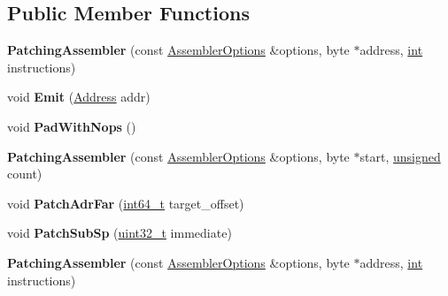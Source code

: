 \subsection*{Public Member Functions}
\begin{DoxyCompactItemize}
\item 
\mbox{\label{classv8_1_1internal_1_1PatchingAssembler_a69d6153dc5c3a3184de9a150e1a11d21}} 
{\bfseries Patching\+Assembler} (const \mbox{\hyperlink{structv8_1_1internal_1_1AssemblerOptions}{Assembler\+Options}} \&options, byte $\ast$address, \mbox{\hyperlink{classint}{int}} instructions)
\item 
\mbox{\label{classv8_1_1internal_1_1PatchingAssembler_a21f415deda7b93478ee24b0523fb45a0}} 
void {\bfseries Emit} (\mbox{\hyperlink{classuintptr__t}{Address}} addr)
\item 
\mbox{\label{classv8_1_1internal_1_1PatchingAssembler_a03f8107222c5246e3512af2d833cac34}} 
void {\bfseries Pad\+With\+Nops} ()
\item 
\mbox{\label{classv8_1_1internal_1_1PatchingAssembler_a9e18e7959b7f1b484a89409709d27503}} 
{\bfseries Patching\+Assembler} (const \mbox{\hyperlink{structv8_1_1internal_1_1AssemblerOptions}{Assembler\+Options}} \&options, byte $\ast$start, \mbox{\hyperlink{classunsigned}{unsigned}} count)
\item 
\mbox{\label{classv8_1_1internal_1_1PatchingAssembler_a9bd484c283ffdb983741703bd58c1d5f}} 
void {\bfseries Patch\+Adr\+Far} (\mbox{\hyperlink{classint64__t}{int64\+\_\+t}} target\+\_\+offset)
\item 
\mbox{\label{classv8_1_1internal_1_1PatchingAssembler_a4ddb2518d2a09628196f025e6bf2882c}} 
void {\bfseries Patch\+Sub\+Sp} (\mbox{\hyperlink{classuint32__t}{uint32\+\_\+t}} immediate)
\item 
\mbox{\label{classv8_1_1internal_1_1PatchingAssembler_a69d6153dc5c3a3184de9a150e1a11d21}} 
{\bfseries Patching\+Assembler} (const \mbox{\hyperlink{structv8_1_1internal_1_1AssemblerOptions}{Assembler\+Options}} \&options, byte $\ast$address, \mbox{\hyperlink{classint}{int}} instructions)
\end{DoxyCompactItemize}
